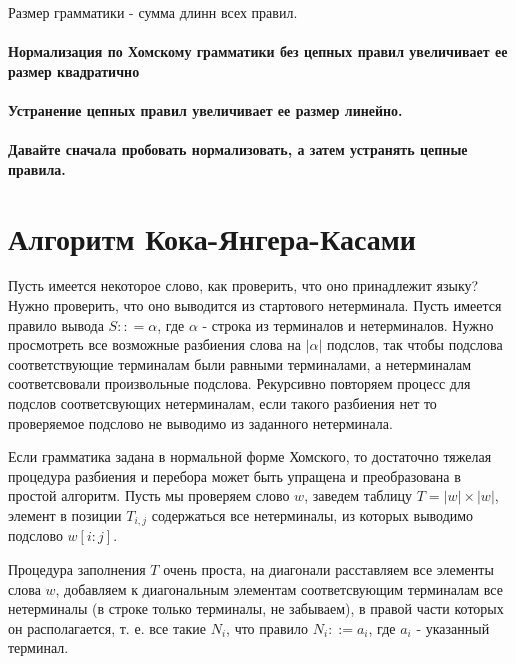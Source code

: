 \begin{Def}
Размер грамматики - сумма длинн всех правил.
\end{Def}

\paragraph{Нормализация по Хомскому грамматики без цепных правил увеличивает ее размер квадратично}

\paragraph{Устранение цепных правил увеличивает ее размер линейно.}

\paragraph{Давайте сначала пробовать нормализовать, а затем устранять цепные правила.}

\section{Алгоритм Кока-Янгера-Касами}

Пусть имеется некоторое слово, как проверить, что оно принадлежит языку? Нужно проверить, что оно выводится из стартового нетерминала. Пусть имеется правило
вывода $S :: = \alpha$, где $\alpha$ - строка из терминалов и нетерминалов. Нужно просмотреть все возможные разбиения слова на $|\alpha|$ подслов, так чтобы
подслова соответствующие терминалам были равными терминалами, а нетерминалам соответсвовали произвольные подслова. Рекурсивно повторяем процесс для подслов
соответсвующих нетерминалам, если такого разбиения нет то проверяемое подслово не выводимо из заданного нетерминала.

Если грамматика задана в нормальной форме Хомского, то достаточно тяжелая процедура разбиения и перебора может быть упращена и преобразована в простой
алгоритм. Пусть мы проверяем слово $w$, заведем таблицу $T = |w|\times|w|$, элемент в позиции $T_{i,j}$ содержаться все нетерминалы, из которых выводимо
подслово $w[i:j]$.

Процедура заполнения $T$ очень проста, на диагонали расставляем все элементы слова $w$, добавляем к диагональным элементам соответсвующим терминалам все
нетерминалы (в строке только терминалы, не забываем), в правой части которых он располагается, т. е. все такие $N_i$, что правило $N_i ::= a_i$, где
$a_i$ - указанный терминал.

